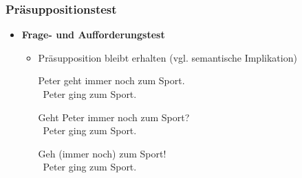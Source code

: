 \begin{frame}
\frametitle{Präsuppositionstest}

\begin{itemize}
	\item \textbf{Frage- und Aufforderungstest}
	
	\begin{itemize}
		\item Präsupposition bleibt erhalten (vgl. semantische Implikation)
		
		\ea Peter geht immer noch zum Sport.\\ \prspp\ Peter ging zum Sport.
		\z
		
		\ea Geht Peter immer noch zum Sport?\\ \prspp\ Peter ging zum Sport.
		\z
		
		\ea Geh (immer noch) zum Sport!\\ \prspp\ Peter ging zum Sport.
		\z
		
		
%		
%		
		
		\end{itemize}

\end{itemize}

\end{frame}



